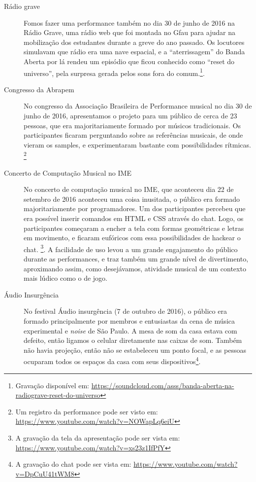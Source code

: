 \begin{description}
\item[Rádio grave] 
Fomos fazer uma performance também no dia 30 de junho de 2016 na Rádio Grave, uma rádio web que foi montada no Gfau para ajudar na mobilização dos  estudantes durante a greve do ano passado. Os locutores simulavam que rádio era uma nave espacial, e a ``aterrissagem'' do Banda Aberta por lá rendeu um episódio que ficou conhecido como ``reset do universo'', pela surpresa gerada pelos sons fora do comum.\footnote{Gravação disponível em: \url{https://soundcloud.com/asss/banda-aberta-na-radiograve-reset-do-universo}}.

\item[Congresso da Abrapem]
No congresso da Associação Brasileira de Performance musical no dia 30 de junho de 2016, apresentamos o projeto para um público de cerca de 23 pessoas, que era majoritariamente formado por músicos tradicionais. Os participantes ficaram perguntando sobre as referências musicais, de onde vieram os samples, e experimentaram bastante com possibilidades rítmicas. \footnote{Um registro da performance pode ser visto em:  \url{https://www.youtube.com/watch?v=NOWapLq6eiU}}


\item[Concerto de Computação Musical no IME] 
No concerto de computação musical no IME, que aconteceu dia 22 de setembro de 2016 aconteceu uma coisa inusitada, o público era formado majoritariamente por programadores. Um dos participantes percebeu que era possível inserir comandos em HTML e CSS através do chat. Logo, os participantes começaram a encher a tela com formas geométricas e letras em movimento, e ficaram eufóricos com essa possibilidades de hackear o chat. \footnote{A gravação da tela da apresentação pode ser vista em: \url{https://www.youtube.com/watch?v=xs23z1IfPfY}}. A facilidade de uso levou a um grande engajamento do público durante as performances, e traz também um grande nível de divertimento, aproximando assim, como desejávamos, atividade musical de um contexto mais lúdico como o de jogo.

\item[Áudio Insurgência] 

No festival Áudio insurgência (7 de outubro de 2016), o público era formado principalmente por membros e entusiastas da cena de música experimental e \emph{noise} de São Paulo. A mesa de som da casa estava com defeito, então ligamos o celular diretamente nas caixas de som. Também não havia projeção, então não se estabeleceu um ponto focal, e as pessoas ocuparam todos os espaços da casa com seus dispositivos\footnote{A gravação do chat pode ser vista em: \url{https://www.youtube.com/watch?v=DpCuU41tWM8}}.


\end{description}
